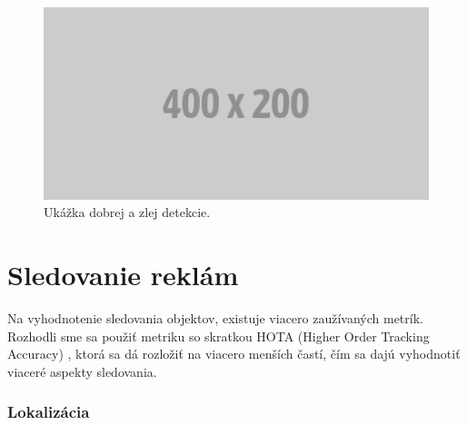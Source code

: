 \\
\begin{figure}[ht]
    \centering
    \includegraphics[width=1\textwidth]{images/placeholder.png}
    \caption{Ukážka dobrej a zlej detekcie.}
    \label{img:lab}
\end{figure}

\section{Sledovanie reklám}

Na vyhodnotenie sledovania objektov, existuje viacero zaužívaných metrík. Rozhodli sme sa použiť metriku so skratkou HOTA (Higher Order Tracking Accuracy) \cite{hota}, ktorá sa dá rozložiť na viacero menších častí, čím sa dajú vyhodnotiť viaceré aspekty sledovania.

\subsubsection{Lokalizácia}


